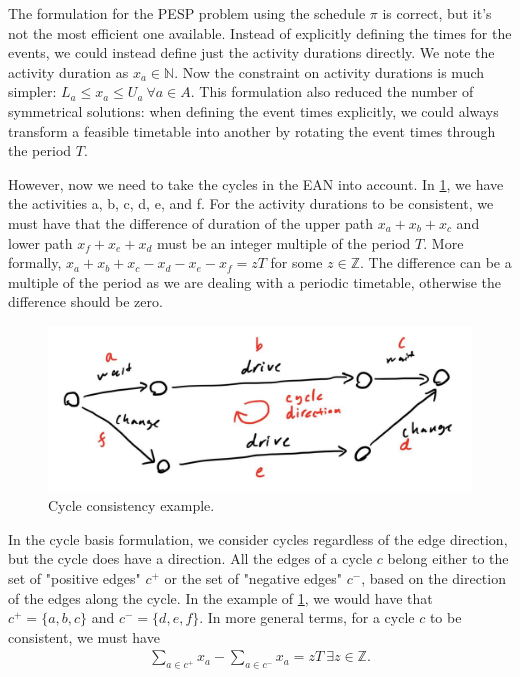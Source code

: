 \documentclass[english, 12pt, a4paper, sci, utf8, a-2b, online]{aaltothesis}
\newcommand{\N}{\mathbb{N}}
\newcommand{\Z}{\mathbb{Z}}
\begin{document}


The formulation for the PESP problem using the schedule $\pi$ is correct, but it's not the most efficient one available. Instead of explicitly defining the times for the events, we could instead define just the activity durations directly. We note the activity duration as $x_a \in \N$. Now the constraint on activity durations is much simpler: $L_a \leq x_a \leq U_a\ \forall a \in A$. This formulation also reduced the number of symmetrical solutions: when defining the event times explicitly, we could always transform a feasible timetable into another by rotating the event times through the period $T$.

However, now we need to take the cycles in the EAN into account. In \cref{fig:cycle-example}, we have the activities a, b, c, d, e, and f. For the activity durations to be consistent, we must have that the difference of duration of the upper path $x_a + x_b + x_c$ and lower path $x_f + x_e + x_d$ must be an integer multiple of the period $T$. More formally, $x_a + x_b + x_c - x_d - x_e - x_f = zT$ for some $z\in \Z$. The difference can be a multiple of the period as we are dealing with a periodic timetable, otherwise the difference should be zero.

\begin{figure}
    \centering
    \includegraphics[width=\textwidth]{figures/cycle-basis-demo.jpg}
    \caption{Cycle consistency example.}
    \label{fig:cycle-example}
\end{figure}

In the cycle basis formulation, we consider cycles regardless of the edge direction, but the cycle does have a direction. All the edges of a cycle $c$ belong either to the set of "positive edges" $c^+$ or the set of "negative edges" $c^-$, based on the direction of the edges along the cycle. In the example of \cref{fig:cycle-example}, we would have that $c^+ = \{a, b, c\}$ and $c^- = \{d, e, f\}$. In more general terms, for a cycle $c$ to be consistent, we must have
\begin{align}
    \sum_{a\in c^+}x_a - \sum_{a \in c^-}x_a = zT\ \exists z \in \Z.
\end{align}
\end{document}
